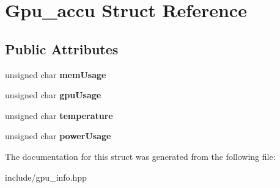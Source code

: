 \hypertarget{structGpu__accu}{}\section{Gpu\+\_\+accu Struct Reference}
\label{structGpu__accu}
\subsection*{Public Attributes}
\begin{DoxyCompactItemize}
\item 
\mbox{\label{structGpu__accu_ab8b1c25687c46e9bbb6db6695e1b4e43}} 
unsigned char {\bfseries mem\+Usage}
\item 
\mbox{\label{structGpu__accu_ac2821c778decdc898ce741fb650d050a}} 
unsigned char {\bfseries gpu\+Usage}
\item 
\mbox{\label{structGpu__accu_a028038dbda5d2497bdd15fbf716fb2ff}} 
unsigned char {\bfseries temperature}
\item 
\mbox{\label{structGpu__accu_a1914c0f83f2666d8f1b00c7e2ac6f145}} 
unsigned char {\bfseries power\+Usage}
\end{DoxyCompactItemize}


The documentation for this struct was generated from the following file\+:\begin{DoxyCompactItemize}
\item 
include/gpu\+\_\+info.\+hpp\end{DoxyCompactItemize}
